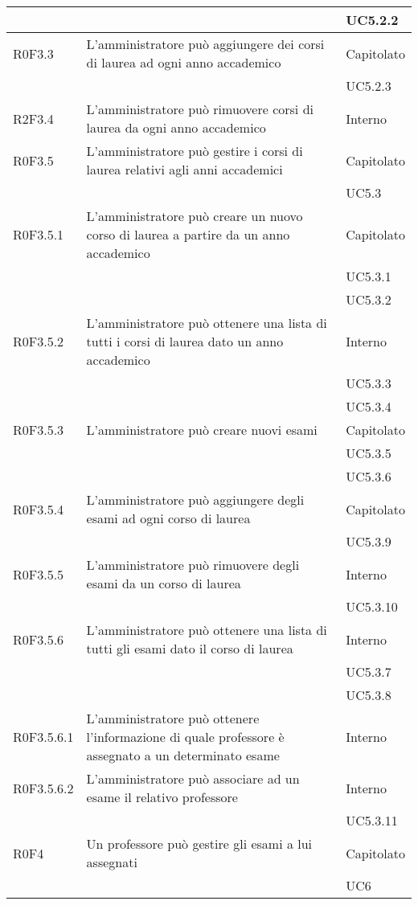 \documentclass[AnalisiDeiRequisiti.tex]{subfiles}
\begin{document}
\begin{longtable}[H]{|p{2cm}|p{5cm}|p{5cm}|}
	& & UC5.2.2 \\ \hline
	R0F3.3 &  L'amministratore può aggiungere dei corsi di laurea ad ogni anno accademico & Capitolato \\ 
	& & UC5.2.3 \\ \hline
	R2F3.4 &  L'amministratore può rimuovere corsi di laurea da ogni anno accademico & Interno \\ \hline
	R0F3.5 &  L'amministratore può gestire i corsi di laurea relativi agli anni accademici & Capitolato \\ 
	& & UC5.3 \\  \hline
	R0F3.5.1 &  L'amministratore può creare un nuovo corso di laurea a partire da un anno accademico & Capitolato \\ 
	& & UC5.3.1 \\  
	& & UC5.3.2 \\ \hline
	R0F3.5.2 &  L'amministratore può ottenere una lista di tutti i corsi di laurea dato un anno accademico & Interno \\ 
	& & UC5.3.3 \\  
	& & UC5.3.4 \\ \hline
	R0F3.5.3 &  L'amministratore può creare nuovi esami & Capitolato \\ 
	& & UC5.3.5 \\  
	& & UC5.3.6 \\ \hline
	R0F3.5.4 &  L'amministratore può aggiungere degli esami ad ogni corso di laurea & Capitolato \\ 
	& & UC5.3.9 \\ \hline
	R0F3.5.5 &  L'amministratore può rimuovere degli esami da un corso di laurea & Interno \\ 
	& & UC5.3.10 \\ \hline
	R0F3.5.6 &  L'amministratore può ottenere una lista di tutti gli esami dato il corso di laurea & Interno \\ 
	& & UC5.3.7 \\ 
	& & UC5.3.8 \\ \hline
	R0F3.5.6.1 &  L'amministratore può ottenere l'informazione di quale professore è assegnato a un determinato esame & Interno \\ \hline
	R0F3.5.6.2  &  L'amministratore può associare ad un esame il relativo professore & Interno \\ 
	& & UC5.3.11 \\ \hline
	R0F4 &  Un professore può gestire gli esami a lui assegnati & Capitolato \\ 
	& & UC6 \\ \hline

\end{longtable}
\end{document}
